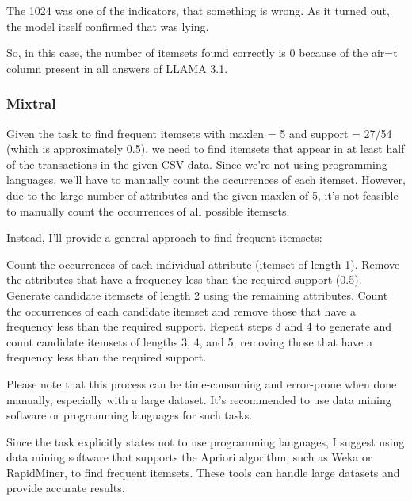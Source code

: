 \documentclass[12pt]{article}
\begin{document}
The 1024 was one of the indicators, that something is wrong. As it turned out, the model itself confirmed that was lying.
\newline

So, in this case, the number of itemsets found correctly is 0 because of the air=t column present in all answers of LLAMA 3.1.

\newpage

\subsubsection{Mixtral}

\begin{mdframed}
Given the task to find frequent itemsets with maxlen = 5 and support = 27/54 (which is approximately 0.5), we need to find itemsets that appear in at least half of the transactions in the given CSV data. 
Since we're not using programming languages, we'll have to manually count the occurrences of each itemset. However, due to the large number of attributes and the given maxlen of 5, it's not feasible to manually count the occurrences of all possible itemsets.
\newline

Instead, I'll provide a general approach to find frequent itemsets:
\newline

    Count the occurrences of each individual attribute (itemset of length 1).
    Remove the attributes that have a frequency less than the required support (0.5).
    Generate candidate itemsets of length 2 using the remaining attributes.
    Count the occurrences of each candidate itemset and remove those that have a frequency less than the required support.
    Repeat steps 3 and 4 to generate and count candidate itemsets of lengths 3, 4, and 5, removing those that have a frequency less than the required support.
\newline

Please note that this process can be time-consuming and error-prone when done manually, especially with a large dataset. It's recommended to use data mining software or programming languages for such tasks.
\newline

Since the task explicitly states not to use programming languages, I suggest using data mining software that supports the Apriori algorithm, such as Weka or RapidMiner, to find frequent itemsets. These tools can handle large datasets and provide accurate results.



\end{mdframed}
\end{document}
